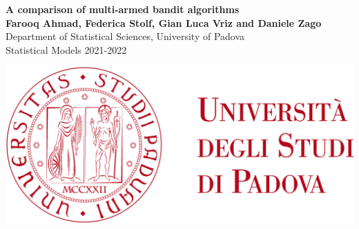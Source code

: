 \documentclass[a0,portrait]{a0poster}
\begin{document}


\begin{minipage}[c]{0.75\linewidth}
\huge \color{DarkRed} \textbf{A comparison of multi-armed bandit algorithms}\\[0.5cm]  \color{Black} %
\Large \textbf{Farooq Ahmad, Federica Stolf, Gian Luca Vriz and Daniele Zago}\\[0.5cm] %
\Large Department of Statistical Sciences, University of Padova \\[0.5cm]
\large
Statistical Models 2021-2022
\end{minipage}
%
\begin{minipage}[c]{0.25\linewidth}
\includegraphics[scale=0.2]{logo_unipd}
\end{minipage}

\vspace{1cm} %

\end{document}

